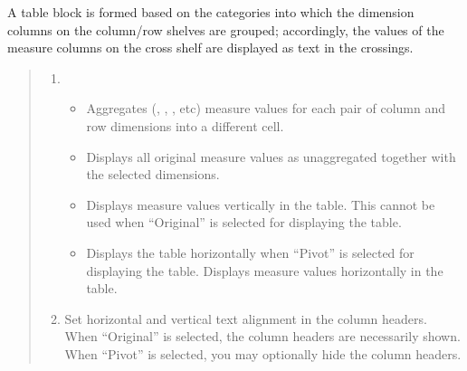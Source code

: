 \documentclass[letterpaper,10pt,english]{sphinxmanual}
\begin{document}
A table block is formed based on the categories into which the dimension columns on the column/row shelves are grouped; accordingly, the values of the measure columns on the cross shelf are displayed as text in the crossings.
\begin{quote}

\begin{figure}[H]
\centering

\noindent{}
\end{figure}
\begin{enumerate}
\def\theenumi{\arabic{enumi}}
\def\labelenumi{\theenumi .}
\makeatletter\def\p@enumii{\p@enumi \theenumi .}\makeatother
\item {} 
\begin{itemize}
\item {} 
 Aggregates (, , , etc) measure values for each pair of column and row dimensions into a different cell.

\item {} 
 Displays all original measure values as unaggregated together with the selected dimensions.

\item {} 
 Displays measure values vertically in the table. This cannot be used when “Original” is selected for displaying the table.

\item {} 
 Displays the table horizontally when “Pivot” is selected for displaying the table. Displays measure values horizontally in the table.

\end{itemize}

\item {} 
 Set horizontal and vertical text alignment in the column headers. When “Original” is selected, the column headers are necessarily shown. When “Pivot” is selected, you may optionally hide the column headers.

\end{enumerate}
\end{quote}

\end{document}
